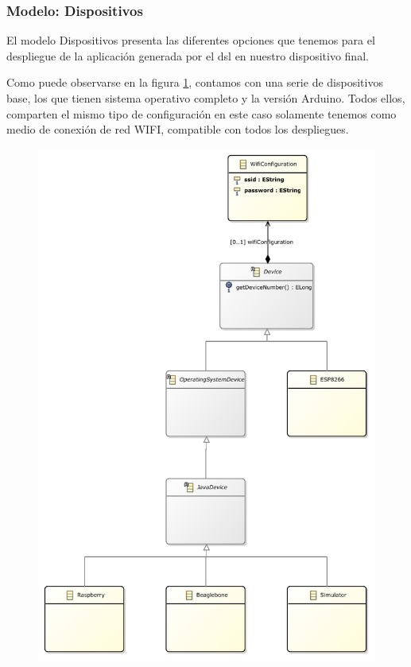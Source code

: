 \subsubsection{Modelo: Dispositivos}

El modelo Dispositivos presenta las diferentes opciones que tenemos para el despliegue de la aplicación generada por el \gls{dsl} en nuestro dispositivo final.

Como puede observarse en la figura \ref{fig:modelo_dispositivos_classes}, contamos con una serie de dispositivos base, los que tienen sistema operativo completo y la versión Arduino. Todos ellos, comparten el mismo tipo de configuración en este caso solamente tenemos como medio de conexión de red WIFI, compatible con todos los despliegues.

\begin{figure}
	\centering
    \includegraphics[width=0.4\textheight]{images/models/deploymentdevices_class_diagram.pdf}
    \label{fig:modelo_dispositivos_classes}
\end{figure}
